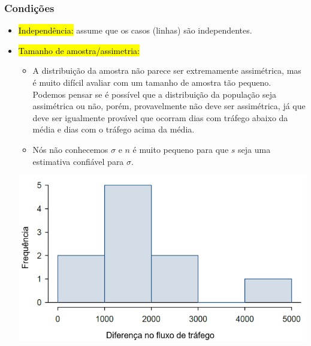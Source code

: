 
\begin{frame}
\frametitle{Condições}

\begin{itemize}
\justifying
\small
\item \hl{Independência:} assume que os casos (linhas) são independentes.

\pause
\justifying
\small
\item \hl{Tamanho de amostra/assimetria:} $\:$ \\

\pause

{
{\tiny
\begin{itemize}
\justifying
\item A distribuição da amostra não parece ser extremamente assimétrica, mas é muito difícil avaliar com um tamanho de amostra tão pequeno. Podemos pensar se é possível que a distribuição da população seja assimétrica ou não, porém, provavelmente não deve ser assimétrica, já que deve ser igualmente provável que ocorram dias com tráfego abaixo da média e dias com o tráfego acima da média.
\justifying
\item Nós não conhecemos $\sigma$ e $n$ é muito pequeno para que $s$ seja uma estimativa confiável para $\sigma$.
\end{itemize}
}
}
{
\includegraphics[width=\textwidth]{5-1_one_t/trafficHist.png}
}
\pause
\small
\justifying
{}
\end{itemize}

$\:$ \\

\end{frame}


